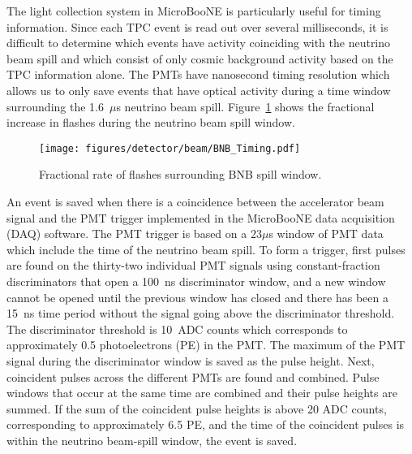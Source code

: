  The light collection system in MicroBooNE is particularly useful for timing
  information. Since each TPC event is read out over several milliseconds, it
  is difficult to determine which events have activity coinciding with the
  neutrino beam spill and which consist of only cosmic background activity
  based on the TPC information alone. The PMTs have nanosecond timing
  resolution which allows us to only save events that have optical activity
  during a time window surrounding the 1.6~$\mu$s neutrino beam spill.
  Figure~\ref{fig:bnbtiming} shows the fractional increase in flashes during
  the neutrino beam spill window.

  \begin{figure}[h]
    \centering
    \texttt{[image: figures/detector/beam/BNB\_Timing.pdf]}
    \caption{Fractional rate of flashes surrounding BNB spill window.}
    \label{fig:bnbtiming}
  \end{figure}

  An event is saved when there is a coincidence between the accelerator beam
  signal and the PMT trigger implemented in the MicroBooNE data acquisition
  (DAQ) software. The PMT trigger is based on a $23 \mu$s window of PMT data
  which include the time of the neutrino beam spill. To form a trigger, first
  pulses are found on the thirty-two individual PMT signals using
  constant-fraction discriminators that open a 100~ns discriminator window, and
  a new window cannot be opened until the previous window has closed and there
  has been a 15~ns time period without the signal going above the discriminator
  threshold.  The discriminator threshold is 10~ADC counts which corresponds to
  approximately 0.5 photoelectrons (PE) in the PMT. The maximum of the PMT
  signal during the discriminator window is saved as the pulse height.  Next,
  coincident pulses across the different PMTs are found and combined.  Pulse
  windows that occur at the same time are combined and their pulse heights are
  summed. If the sum of the coincident pulse heights is above 20 ADC counts,
  corresponding to approximately 6.5 PE, and the time of the coincident pulses
  is within the neutrino beam-spill window, the event is saved.


